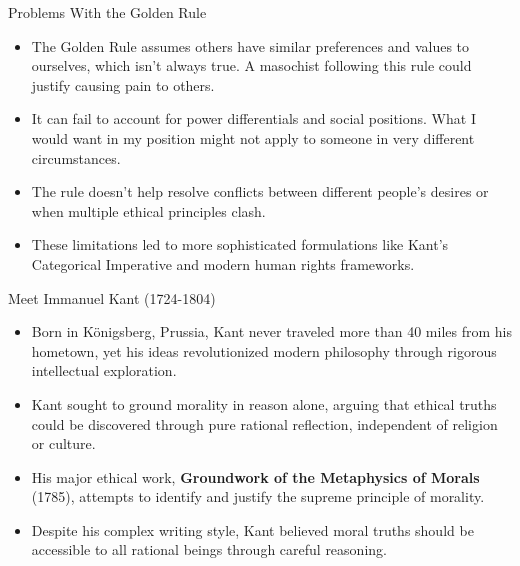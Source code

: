 \documentclass{beamer}
\begin{document}
\begin{frame}{Problems With the Golden Rule}
\begin{itemize}
    \item The Golden Rule assumes others have similar preferences and values to ourselves, which isn't always true. A masochist following this rule could justify causing pain to others.
    
    \item It can fail to account for power differentials and social positions. What I would want in my position might not apply to someone in very different circumstances.
    
    \item The rule doesn't help resolve conflicts between different people's desires or when multiple ethical principles clash.
    
    \item These limitations led to more sophisticated formulations like Kant's Categorical Imperative and modern human rights frameworks.
\end{itemize}
\end{frame}

\begin{frame}{Meet Immanuel Kant (1724-1804)}
\begin{itemize}
    \item Born in Königsberg, Prussia, Kant never traveled more than 40 miles from his hometown, yet his ideas revolutionized modern philosophy through rigorous intellectual exploration.
    
    \item Kant sought to ground morality in reason alone, arguing that ethical truths could be discovered through pure rational reflection, independent of religion or culture.
    
    \item His major ethical work, \textbf{Groundwork of the Metaphysics of Morals} (1785), attempts to identify and justify the supreme principle of morality.
    
    \item Despite his complex writing style, Kant believed moral truths should be accessible to all rational beings through careful reasoning.
\end{itemize}
\end{frame}
\end{document}
